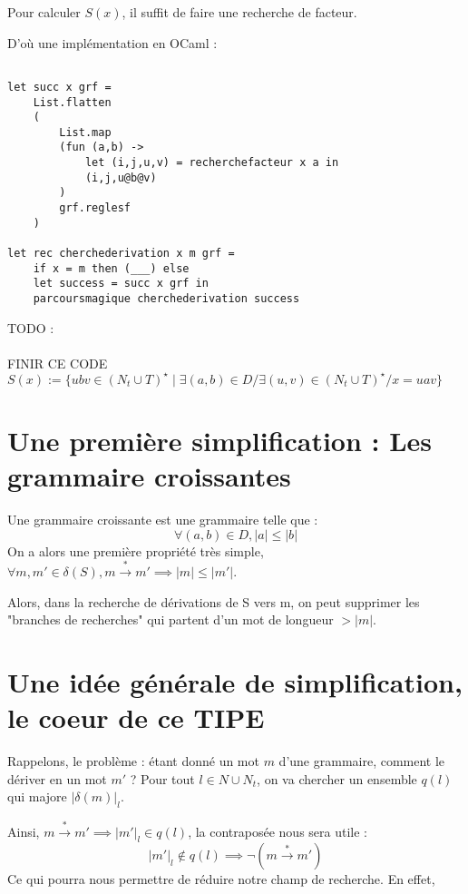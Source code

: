 \documentclass[a4paper,10pt
]{article}
\newcommand{\norm}[1]{\lvert #1 \rvert}
\begin{document}
Pour calculer $S(x)$, il suffit de faire une recherche de facteur.

D'où une implémentation en OCaml : 
\begin{verbatim}

let succ x grf = 
    List.flatten
    (
        List.map 
        (fun (a,b) ->
            let (i,j,u,v) = recherchefacteur x a in
            (i,j,u@b@v)
        )
        grf.reglesf
    )

let rec cherchederivation x m grf =
    if x = m then (___) else
    let success = succ x grf in 
    parcoursmagique cherchederivation success
\end{verbatim}

{\color{red} TODO :\\\\  FINIR CE CODE }\\
$S(x):= \{ubv \in (N_t \cup T)^\star \mid \exists (a,b) \in D / \exists (u,v)\in (N_t \cup T)^\star / x = uav\}$

\section{Une première simplification : Les grammaire croissantes}

Une grammaire croissante est une grammaire telle que :
\begin{equation}\forall (a,b) \in D, \norm{a} \leq \norm{b} \end{equation}
On a alors une première propriété très simple, $\forall m, m' \in \delta (S), m \overset{*}{\rightarrow} m' \implies \norm{m} \leq \norm{m'}$.

Alors, dans la recherche de dérivations de S vers m, on peut supprimer les "branches de recherches" qui partent d'un mot de longueur $> \norm{m}$.

\section{Une idée générale de simplification, le coeur de ce TIPE}
Rappelons, le problème : étant donné un mot $m$ d'une grammaire, comment le dériver en un mot $m'$ ?
Pour tout $l \in N\cup N_t$, on va chercher un ensemble $q(l)$ qui majore $\norm{\delta(m)}_l$.

Ainsi, $m \overset{*}{\rightarrow} m' \implies \norm{m'}_l \in q(l)$, la contraposée nous sera utile : 
\begin{equation*}
\norm{m'}_l \notin q(l) \implies  \neg (m \overset{*}{\rightarrow} m')
\end{equation*}
Ce qui pourra nous permettre de réduire notre champ de recherche.
En effet, 
\end{document}
